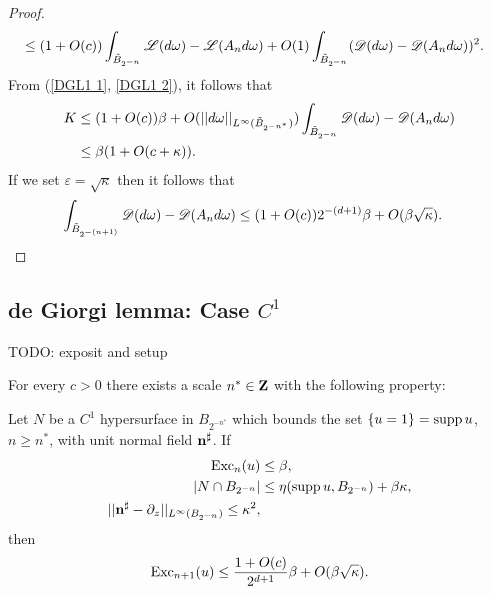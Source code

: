 \begin{proof}
\begin{align*}
&\leq (1 + O(c)) \int_{\tilde B_{2^{-n}}} \mathscr L(d\omega) - \mathscr L(A_n d\omega) + O(1) \int_{\tilde B_{2^{-n}}} (\mathscr D(d\omega) - \mathscr D(A_n d\omega))^2.
\end{align*}
From (\ref{DGL1 1}, \ref{DGL1 2}), it follows that
\begin{align*}
K &\leq (1 + O(c))\beta + O(||d\omega||_{L^\infty(\tilde B_{2^{-n^*}})}) \int_{\tilde B_{2^{-n}}} \mathscr D(d\omega) - \mathscr D(A_n d\omega)\\
&\leq \beta(1 + O(c + \kappa)).
\end{align*}
If we set $\varepsilon = \sqrt \kappa$ then it follows that
\begin{align*}
\int_{\tilde B_{2^{-(n+1)}}} \mathscr D(d\omega) - \mathscr D(A_n d\omega) &\leq (1 + O(c)) 2^{-(d + 1)} \beta + O(\beta \sqrt \kappa). \qedhere
\end{align*}
\end{proof}


\subsection{de Giorgi lemma: Case \texorpdfstring{$C^1$}{C1}}
TODO: exposit and setup

\begin{lemma}\label{DGL2 1}
For every $c > 0$ there exists a scale $n^* \in \mathbf{Z}$ with the following property:

Let $N$ be a $C^1$ hypersurface in $B_{2^{-n^*}}$ which bounds the set $\{u = 1\} = \operatorname{supp} u$, $n \geq n^*$, with unit normal field $\mathbf n^\sharp$.
If
\begin{align}
\operatorname{Exc}_n(u) &\leq \beta, \label{DGL2 1}\\
|N \cap B_{2^{-n}}| &\leq \eta(\operatorname{supp} u, B_{2^{-n}}) + \beta \kappa, \label{DGL2 2}\\
||\mathbf n^\sharp - \partial_z||_{L^\infty(B_{2^{-n}})} \leq \kappa^2, \label{DGL2 3}
\end{align}
then
$$\operatorname{Exc}_{n + 1}(u) \leq \frac{1 + O(c)}{2^{d + 1}} \beta + O(\beta \sqrt \kappa).$$
\end{lemma}


